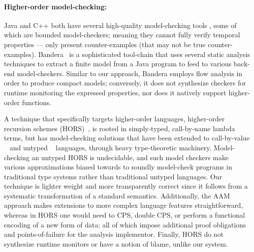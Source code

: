 \paragraph{Higher-order model-checking:}
Java and C++ both have several high-quality model-checking tools \citep{ianjohnson:bandera, ianjohnson:java-pathfinder, ianjohnson:LLBMC}, some of which are bounded model-checkers; meaning they cannot fully verify temporal properties --- only present counter-examples (that may not be true counter-examples).
%
Bandera~\citep{ianjohnson:bandera} is a sophisticated tool-chain that uses several static analysis techniques to extract a finite model from a Java program to feed to various back-end model-checkers.
%
Similar to our approach, Bandera employs flow analysis in order to produce compact models; conversely, it does not synthesize checkers for runtime monitoring the expressed properties, nor does it natively support higher-order functions.

A technique that specifically targets higher-order languages, higher-order recursion schemes (HORS)~\citep{ianjohnson:Knapik:2002:HPT:646794.704852}, is rooted in simply-typed, call-by-name lambda terms, but has model-checking solutions that have been extended to call-by-value ~\citep{?} and untyped ~\citep{?} languages, through heavy type-theoretic machinery.
%
Model-checking an untyped HORS is undecidable, and such model checkers make various approximations biased towards to soundly model-check programs in traditional type systems rather than traditional untyped languages.
%
Our technique is lighter weight and more transparently correct since it follows from a systematic transformation of a standard semantics.
%
Additionally, the AAM approach makes extensions to more complex language features straightforward, whereas in HORS one would need to CPS, double CPS, or perform a functional encoding of a new form of data; all of which impose additional proof obligations and points-of-failure for the analysis implementor.
%
Finally, HORS do not synthesize runtime monitors or have a notion of blame, unlike our system.


